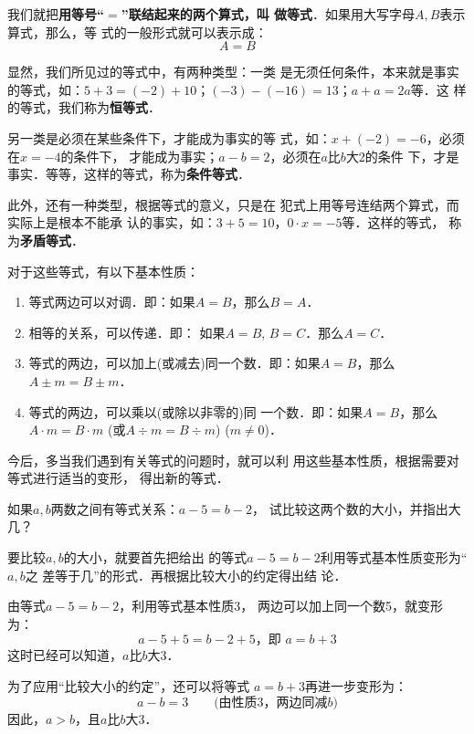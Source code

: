 我们就把\textbf{用等号“$=$”联结起来的两个算式，叫
做等式}．如果用大写字母$A, B$表示算式，那么，等
式的一般形式就可以表示成：
                      \[A=B\]
                      
显然，我们所见过的等式中，有两种类型：一类
是无须任何条件，本来就是事实的等式，如：$5+3=
  (-2)+10$；$(-3)-(-16)= 13$；$a+a=2a$等．这
样的等式，我们称为\textbf{恒等式}．

另一类是必须在某些条件下，才能成为事实的等
式，如：$x+(-2)=-6$，必须在$x=-4$的条件下，
才能成为事实；$a-b=2$，必须在$a$比$b$大2的条件
下，才是事实．等等，这样的等式，称为\textbf{条件等式}．

    此外，还有一种类型，根据等式的意义，只是在
犯式上用等号连结两个算式，而实际上是根本不能承
认的事实，如：$3+5=10$，$0\cdot x=-5$等．这样的等式，
称为\textbf{矛盾等式}．

对于这些等式，有以下基本性质：

\begin{blk}{}
\begin{enumerate}
    \item 等式两边可以对调．即：如果$A= B$，那么$B=A$．
    \item 相等的关系，可以传递．即：
    如果$A=B$,  $B=C$．那么$A=C$．
    \item 等式的两边，可以加上(或减去)同一个数．即：如果$A= B$，那么$A\pm m=B\pm m$．
    \item 等式的两边，可以乘以(或除以非零的)同
一个数．即：如果$A=B$，那么$A\cdot m=B\cdot m$ (或$A\div m =
B\div m$) ($m\ne 0$)．
\end{enumerate}
\end{blk}


今后，多当我们遇到有关等式的问题时，就可以利
用这些基本性质，根据需要对等式进行适当的变形，
得出新的等式．

\begin{example}
    如果$a,b$两数之间有等式关系：$a-5=b-2$，
试比较这两个数的大小，并指出大几？
\end{example}

\begin{analyze}
    要比较$a,b$的大小，就要首先把给出
的等式$a-5=b-2$利用等式基本性质变形为“$a, b$之
差等于几”的形式．再根据比较大小的约定得出结
论．
\end{analyze}

\begin{solution}
    由等式$a-5=b-2$，利用等式基本性质3，
两边可以加上同一个数5，就变形为：
      \[a-5+5=b-2+5，\text{即 } a=b+3\]
    这时已经可以知道，$a$比$b$大3．

    为了应用“比较大小的约定”，还可以将等式
$a=b+3$再进一步变形为：
\[a-b=3\qquad \text{(由性质3，两边同减$b$)}\]
    因此，$a>b$，且$a$比$b$大3．
\end{solution}

